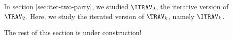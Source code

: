 In section \ref{sec:iter-two-party}, we studied $\ITRAV_2$, the iterative version of $\TRAV_2$. Here, we study the iterated version of $\TRAV_k$, namely $\ITRAV_k$.

The rest of this section is under construction!